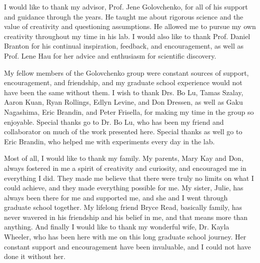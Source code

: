 
I would like to thank my advisor, Prof. Jene Golovchenko, for all of his support and guidance through the years.  He taught me about rigorous science and the value of creativity and questioning assumptions.  He allowed me to pursue my own creativity throughout my time in his lab.  I would also like to thank Prof. Daniel Branton for his continual inspiration, feedback, and encouragement, as well as Prof. Lene Hau for her advice and enthusiasm for scientific discovery.

My fellow members of the Golovchenko group were constant sources of support, encouragement, and friendship, and my graduate school experience would not have been the same without them.  I wish to thank Drs. Bo Lu, Tamas Szalay, Aaron Kuan, Ryan Rollings, Edlyn Levine, and Don Dressen, as well as Gaku Nagashima, Eric Brandin, and Peter Frisella, for making my time in the group so enjoyable.  Special thanks go to Dr. Bo Lu, who has been my friend and collaborator on much of the work presented here.  Special thanks as well go to Eric Brandin, who helped me with experiments every day in the lab.

Most of all, I would like to thank my family.  My parents, Mary Kay and Don, always fostered in me a spirit of creativity and curiosity, and encouraged me in everything I did.  They made me believe that there were truly no limits on what I could achieve, and they made everything possible for me.  My sister, Julie, has always been there for me and supported me, and she and I went through graduate school together.  My lifelong friend Bryce Read, basically family, has never wavered in his friendship and his belief in me, and that means more than anything.  And finally I would like to thank my wonderful wife, Dr. Kayla Wheeler, who has been here with me on this long graduate school journey.  Her constant support and encouragement have been invaluable, and I could not have done it without her.